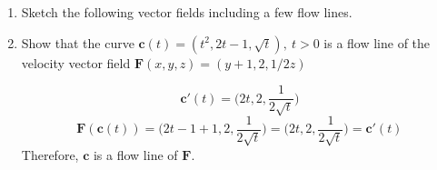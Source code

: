 \documentclass{article}
\newcommand{\gam}{\boldsymbol{\gamma}}
\begin{document}
\begin{enumerate}
\begin{enumerate}[resume]
                (see page 235, \#20)

        \end{enumerate}
        If $\gam(s)$ is a unit speed curve we can define the \textit{tortion} $\tau$ by $\frac{d \boldsymbol{B}}{ds} = - \tau \boldsymbol{N}$.
        \begin{enumerate}[resume] 
            \item Compute the torsion of $\boldsymbol{\sigma}(t) = \frac{1}{\sqrt{2}}(\cos t, \sin t)$.

                (see page 235, \#21(c))
        \end{enumerate}
    \newpage
    \item Sketch the following vector fields including a few flow lines.

    \newpage
    \item Show that the curve $\boldsymbol{c}(t) = ( t^2, 2t -1, \sqrt{t}),\ t > 0$ is a flow line of the velocity vector field $\boldsymbol{F}(x,y,z) = (y + 1,2,1/2z)$

        \[\boldsymbol{c}'(t) = \Big(2t, 2, \frac{1}{2\sqrt{t}}\Big) \]
        \[ \boldsymbol{F}(\boldsymbol{c}(t)) = \Big(2t - 1 + 1, 2, \frac{1}{2\sqrt{t}}\Big) = \Big(2t, 2, \frac{1}{2\sqrt{t}}\Big) = \boldsymbol{c}'(t) \]
        Therefore, $\boldsymbol{c}$ is a flow line of $\boldsymbol{F}$.


\end{enumerate}
\end{document}
